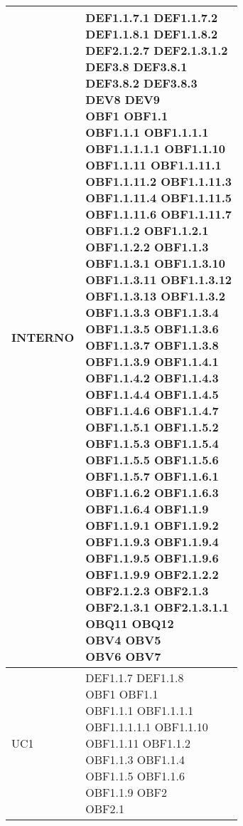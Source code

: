 \documentclass{scalatekids-article}
\begin{document}
\begin{longtable}[H]{|p{5.5cm}|p{5.5cm}|}
  INTERNO & \multiLineCell[t]{DEF1.1.7.1 DEF1.1.7.2\\DEF1.1.8.1 DEF1.1.8.2\\DEF2.1.2.7 DEF2.1.3.1.2\\DEF3.8 DEF3.8.1\\DEF3.8.2 DEF3.8.3\\DEV8 DEV9\\OBF1 OBF1.1\\OBF1.1.1 OBF1.1.1.1\\OBF1.1.1.1.1 OBF1.1.10\\OBF1.1.11 OBF1.1.11.1\\OBF1.1.11.2 OBF1.1.11.3\\OBF1.1.11.4 OBF1.1.11.5\\OBF1.1.11.6 OBF1.1.11.7\\OBF1.1.2 OBF1.1.2.1\\OBF1.1.2.2 OBF1.1.3\\OBF1.1.3.1 OBF1.1.3.10\\OBF1.1.3.11 OBF1.1.3.12\\OBF1.1.3.13 OBF1.1.3.2\\OBF1.1.3.3 OBF1.1.3.4\\OBF1.1.3.5 OBF1.1.3.6\\OBF1.1.3.7 OBF1.1.3.8\\OBF1.1.3.9 OBF1.1.4.1\\OBF1.1.4.2 OBF1.1.4.3\\OBF1.1.4.4 OBF1.1.4.5\\OBF1.1.4.6 OBF1.1.4.7\\OBF1.1.5.1 OBF1.1.5.2\\OBF1.1.5.3 OBF1.1.5.4\\OBF1.1.5.5 OBF1.1.5.6\\OBF1.1.5.7 OBF1.1.6.1\\OBF1.1.6.2 OBF1.1.6.3\\OBF1.1.6.4 OBF1.1.9\\OBF1.1.9.1 OBF1.1.9.2\\OBF1.1.9.3 OBF1.1.9.4\\OBF1.1.9.5 OBF1.1.9.6\\OBF1.1.9.9 OBF2.1.2.2\\OBF2.1.2.3 OBF2.1.3\\OBF2.1.3.1 OBF2.1.3.1.1\\OBQ11 OBQ12\\OBV4 OBV5\\OBV6 OBV7\\}\\
  \hline
  UC1 & \multiLineCell[t]{DEF1.1.7 DEF1.1.8\\OBF1 OBF1.1\\OBF1.1.1 OBF1.1.1.1\\OBF1.1.1.1.1 OBF1.1.10\\OBF1.1.11 OBF1.1.2\\OBF1.1.3 OBF1.1.4\\OBF1.1.5 OBF1.1.6\\OBF1.1.9 OBF2\\OBF2.1\\}\\

\end{longtable}
\end{document}
